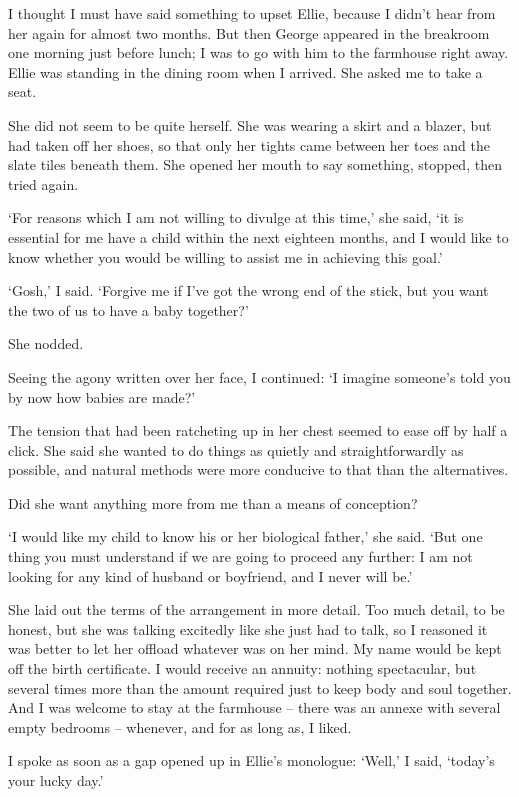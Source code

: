 I thought I must have said something to upset Ellie, because I didn't hear from her again for almost two months. But then George appeared in the breakroom one morning just before lunch; I was to go with him to the farmhouse right away. Ellie was standing in the dining room when I arrived. She asked me to take a seat.

She did not seem to be quite herself. She was wearing a skirt and a blazer, but had taken off her shoes, so that only her tights came between her toes and the slate tiles beneath them. She opened her mouth to say something, stopped, then tried again.

`For reasons which I am not willing to divulge at this time,' she said, `it is essential for me have a child within the next eighteen months, and I would like to know whether you would be willing to assist me in achieving this goal.'

`Gosh,' I said. `Forgive me if I've got the wrong end of the stick, but you want the two of us to have a baby together?'

She nodded.

Seeing the agony written over her face, I continued: `I imagine someone's told you by now how babies are made?'

The tension that had been ratcheting up in her chest seemed to ease off by half a click. She said she wanted to do things as quietly and straightforwardly as possible, and natural methods were more conducive to that than the alternatives.

Did she want anything more from me than a means of conception?

`I would like my child to know his or her biological father,' she said. `But one thing you must understand if we are going to proceed any further: I am not looking for any kind of husband or boyfriend, and I never will be.'

She laid out the terms of the arrangement in more detail. Too much detail, to be honest, but she was talking excitedly like she just had to talk, so I reasoned it was better to let her offload whatever was on her mind. My name would be kept off the birth certificate. I would receive an annuity: nothing spectacular, but several times more than the amount required just to keep body and soul together. And I was welcome to stay at the farmhouse -- there was an annexe with several empty bedrooms -- whenever, and for as long as, I liked.

I spoke as soon as a gap opened up in Ellie's monologue: `Well,' I said, `today's your lucky day.'


